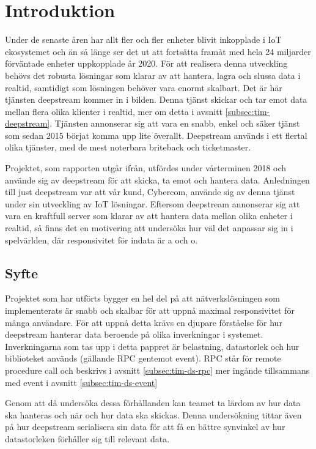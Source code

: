 \section{Introduktion}

Under de senaste åren har allt fler och fler enheter blivit inkopplade i IoT ekosystemet och än så länge ser det ut att fortsätta framåt med hela 24 miljarder förväntade enheter uppkopplade år 2020\cite{IoT-ecosystem}. För att realisera denna utveckling behövs det robusta lösningar som klarar av att hantera, lagra och slussa data i realtid, samtidigt som lösningen behöver vara enormt skalbart. Det är här tjänsten deepstream\cite{deepstream} kommer in i bilden. Denna tjänst skickar och tar emot data mellan flera olika klienter i realtid, mer om detta i avsnitt \ref{subsec:tim-deepstream}. Tjänsten annonserar sig att vara en snabb, enkel och säker tjänst som sedan 2015 börjat komma upp lite överallt. Deepstream används i ett flertal olika tjänster, med de mest noterbara briteback och ticketmaster\cite{ds-usecases}.

Projektet, som rapporten utgår ifrån, utfördes under vårterminen 2018 och använde sig av deepstream för att skicka, ta emot och hantera data. Anledningen till just deepstream var att vår kund, Cybercom, använde sig av denna tjänst under sin utveckling av IoT lösningar. Eftersom deepstream annonserar sig att vara en kraftfull server som klarar av att hantera data mellan olika enheter i realtid, så finns det en motivering att undersöka hur väl det anpassar sig in i spelvärlden, där responsivitet för indata är a och o.

\subsection{Syfte}
\label{subsec:tim-aim}
Projektet som har utförts bygger en hel del på att nätverkslösningen som implementerats är snabb och skalbar för att uppnå maximal responsivitet för många användare. För att uppnå detta krävs en djupare förståelse för hur deepstream hanterar data beroende på olika inverkningar i systemet. Inverkningarna som tas upp i detta pappret är belastning, datastorlek och hur biblioteket används (gällande RPC gentemot event). RPC står för remote procedure call och beskrivs i avsnitt \ref{subsec:tim-ds-rpc} mer ingånde tillsammans med event i avsnitt \ref{subsec:tim-ds-event}

Genom att då undersöka dessa förhållanden kan teamet ta lärdom av hur data ska hanteras och när och hur data ska skickas. Denna undersökning tittar även på hur deepstream serialisera sin data för att få en bättre synvinkel av hur datastorleken förhåller sig till relevant data.

